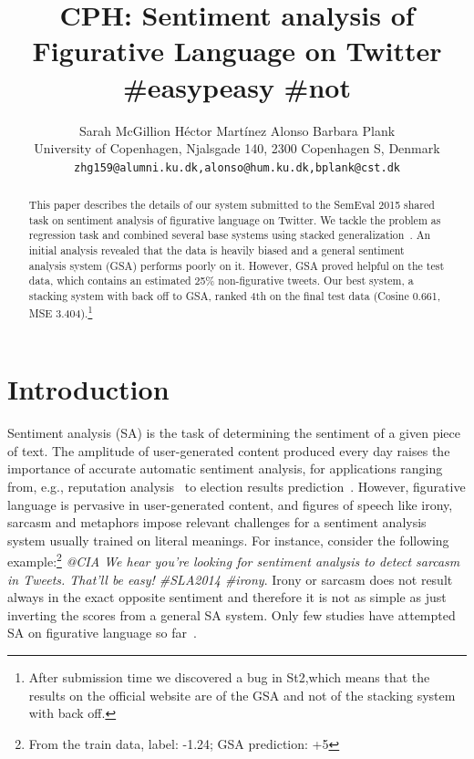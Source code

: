 \documentclass[11pt,letterpaper]{article}
\title{CPH: Sentiment analysis of Figurative Language on Twitter \#easypeasy \#not}
\author{Sarah McGillion \quad  H\'{e}ctor Mart\'{i}nez Alonso \quad Barbara Plank\\
   University of Copenhagen, Njalsgade 140, 2300 Copenhagen S, Denmark \\
  {\tt zhg159@alumni.ku.dk,alonso@hum.ku.dk,bplank@cst.dk}}
\date{}
\begin{document}
\maketitle
\begin{abstract}
 This paper describes the details of our system submitted to the SemEval 2015 shared task on sentiment analysis of figurative language on Twitter. We tackle the problem as regression task and combined several base systems using stacked generalization~\cite{Wolpert:1992}. An initial analysis revealed that the data is heavily biased and a general sentiment analysis system (GSA) performs poorly on it. However, GSA proved helpful on the test data, which contains an estimated 25\% non-figurative tweets. Our best system, a stacking system with back off to GSA, ranked 4th on the final test data (Cosine 0.661, MSE 3.404).\footnote{After submission time we discovered a bug in {\sc St2},which means that the results on the official website are of the GSA and not of the stacking system with back off.}
 
\end{abstract}

\section{Introduction}
Sentiment analysis (SA) is the task of determining the sentiment of a given piece of text.
 The amplitude of user-generated content produced every day raises the importance of accurate automatic sentiment analysis, for applications ranging from, e.g., reputation analysis~\cite{amigo2013overview} to election results prediction~\cite{sang2012predicting}. However, figurative language is pervasive in user-generated content, and figures of speech like irony, sarcasm and metaphors impose relevant challenges for a sentiment analysis system usually trained on literal meanings.
For instance, consider the following example:\footnote{From the train data, label: -1.24; GSA prediction: +5} {\em @CIA We hear you're looking for sentiment analysis to detect sarcasm in Tweets. That'll be easy! \#SLA2014 \#irony}. %
 Irony or sarcasm does not result always in the exact opposite sentiment and therefore it is not as simple as just inverting the scores from a general SA system.
Only few studies have attempted SA on figurative language so far~\cite{reyes2012making,reyes2013multidimensional}.
\end{document}
